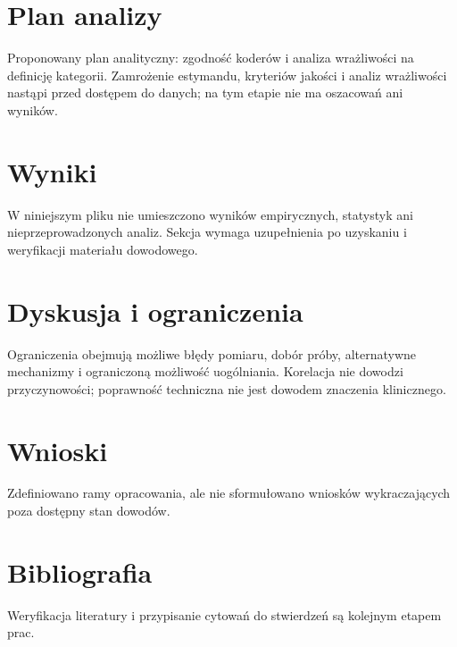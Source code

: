 \documentclass[11pt,a4paper]{article}
\begin{document}
\section{Plan analizy}

Proponowany plan analityczny: zgodność koderów i analiza wrażliwości na definicję kategorii. Zamrożenie estymandu, kryteriów jakości i analiz wrażliwości nastąpi przed dostępem do danych; na tym etapie nie ma oszacowań ani wyników.

\section{Wyniki}

W niniejszym pliku nie umieszczono wyników empirycznych, statystyk ani nieprzeprowadzonych analiz. Sekcja wymaga uzupełnienia po uzyskaniu i weryfikacji materiału dowodowego.

\section{Dyskusja i ograniczenia}

Ograniczenia obejmują możliwe błędy pomiaru, dobór próby, alternatywne mechanizmy i ograniczoną możliwość uogólniania. Korelacja nie dowodzi przyczynowości; poprawność techniczna nie jest dowodem znaczenia klinicznego.

\section{Wnioski}

Zdefiniowano ramy opracowania, ale nie sformułowano wniosków wykraczających poza dostępny stan dowodów.

\section*{Bibliografia}

Weryfikacja literatury i przypisanie cytowań do stwierdzeń są kolejnym etapem prac.
\end{document}
